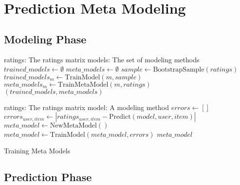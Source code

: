 \section{Prediction Meta Modeling}

\subsection{Modeling Phase}

\begin{algorithm}
  \begin{algorithmic}[1]
  \REQUIRE ratings: The ratings matrix
  \REQUIRE models: The set of modeling methods
  \ENSURE
    \STATE $trained\_models \gets \emptyset$
    \STATE $meta\_models \gets \emptyset$
      \STATE $sample \gets \mathrm{BootstrapSample}(ratings)$
      \STATE $trained\_models_m \gets \mathrm{TrainModel}(m, sample)$
      \STATE $meta\_models_m \gets \mathrm{TrainMetaModel}(m, ratings)$
    \ENDFOR 
  \RETURN $(trained\_models, meta\_models)$
  \end{algorithmic}
  \caption[Training]{Training
  }
  \label{code:training}
\end{algorithm}



\begin{algorithm}
  \begin{algorithmic}[1]
  \REQUIRE ratings: The ratings matrix
  \REQUIRE model: A modeling method
  \ENSURE
    \STATE $errors \gets []$
        \STATE $errors_{user,item} \gets | ratings_{user,item} - \mathrm{Predict}(model, user, item) |$
    \ENDFOR 
    \STATE $meta\_model \gets \mathrm{NewMetaModel}()$
    \STATE $meta\_model \gets \mathrm{TrainModel}(meta\_model, errors)$
  \RETURN $meta\_model$
  \end{algorithmic}
  \caption[Training Meta Models]{Training Meta Models}
  \label{code:trainmetamodel}
\end{algorithm}







\subsection{Prediction Phase}


